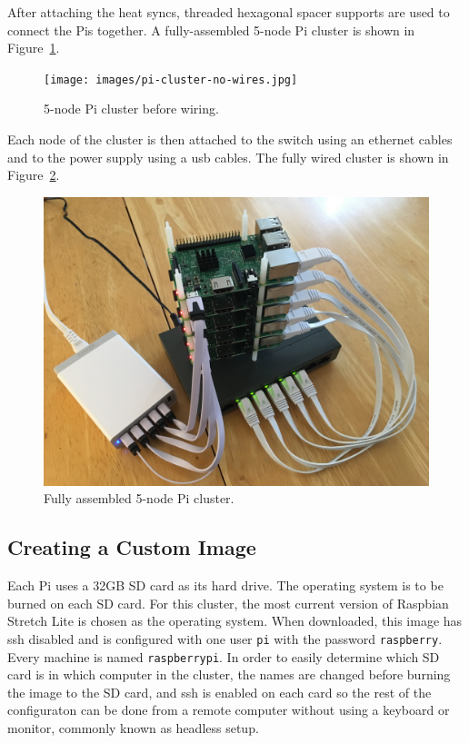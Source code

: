 After attaching the heat syncs, threaded hexagonal spacer supports are
used to connect the Pis together. A fully-assembled 5-node Pi cluster
is shown in Figure~\ref{f:cluster-no-wires}.

\begin{figure}[!ht]
  \centering\texttt{[image: images/pi-cluster-no-wires.jpg]}
  \caption{5-node Pi cluster before wiring.}\label{f:cluster-no-wires}
\end{figure}

Each node of the cluster is then attached to the switch using an
ethernet cables and to the power supply using a usb cables. The fully
wired cluster is shown in Figure~\ref{f:complete-cluster}.

\begin{figure}[!ht]
  \centering\includegraphics[width=\columnwidth]{images/complete-pi-cluster.jpg}
  \caption{Fully assembled 5-node Pi cluster.}\label{f:complete-cluster}
\end{figure}

\subsection{Creating a Custom Image}
Each Pi uses a 32GB SD card as its hard drive. The operating system is
to be burned on each SD card. For this cluster, the most current
version of Raspbian Stretch Lite is chosen as the operating
system. When downloaded, this image has ssh disabled and is configured
with one user \verb|pi| with the password \verb|raspberry|. Every
machine is named \verb|raspberrypi|. In order to easily determine
which SD card is in which computer in the cluster, the names are
changed before burning the image to the SD card, and ssh is enabled on
each card so the rest of the configuraton can be done from a remote
computer without using a keyboard or monitor, commonly known as
headless setup.

